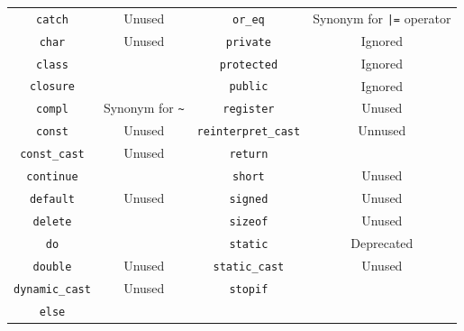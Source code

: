 \documentclass[openright,twoside,12pt]{report}
\newcommand   {\floatpos}          {htbp}
\begin{document}
\begin{table}[\floatpos]
\begin{tabular}{|c|c||c|c|}
    \lstinline"catch"             & Unused                                  &
    \lstinline"or_eq"             & Synonym for \lstinline-|=- operator     \\
    \lstinline"char"              & Unused                                  &
    \lstinline"private"           & Ignored                                 \\
    \lstinline"class"             &                                         &
    \lstinline"protected"         & Ignored                                 \\
    \lstinline"closure"           &                                         &
    \lstinline"public"            & Ignored                                 \\
    \lstinline"compl"             & Synonym for \lstinline|~|               &
    \lstinline"register"          & Unused                                  \\
    \lstinline"const"             & Unused                                  &
    \lstinline"reinterpret_cast"  & Unnused                                 \\
    \lstinline"const_cast"        & Unused                                  &
    \lstinline"return"            &                                         \\
    \lstinline"continue"          &                                         &
    \lstinline"short"             & Unused                                  \\
    \lstinline"default"           & Unused                                  &
    \lstinline"signed"            & Unused                                  \\
    \lstinline"delete"            &                                         &
    \lstinline"sizeof"            & Unused                                  \\
    \lstinline"do"                &                                         &
    \lstinline"static"            & Deprecated                              \\
    \lstinline"double"            & Unused                                  &
    \lstinline"static_cast"       & Unused                                  \\
    \lstinline"dynamic_cast"      & Unused                                  &
    \lstinline"stopif"            &                                         \\
    \lstinline"else"              &                                         &

\end{tabular}
\end{table}
\end{document}
